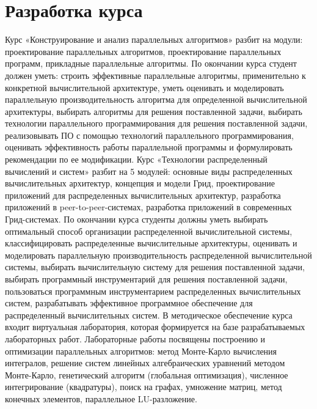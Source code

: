 \documentclass[12pt]{article}
\begin{document}
\section{Разработка курса}
\indent\indent Курс «Конструирование и анализ параллельных алгоритмов» разбит на модули: проектирование параллельных алгоритмов, проектирование параллельных программ, прикладные параллельные алгоритмы. По окончании курса студент должен уметь: строить эффективные параллельные алгоритмы, применительно к конкретной вычислительной архитектуре, уметь оценивать и моделировать параллельную производительность алгоритма для определенной вычислительной архитектуры, выбирать алгоритмы для решения поставленной задачи, выбирать технологии параллельного программирования для решения поставленной задачи, реализовывать ПО с помощью технологий параллельного программирования, оценивать эффективность работы параллельной программы и формулировать рекомендации по ее модификации. \newline
\indent Курс «Технологии распределенный вычислений и систем» разбит на 5 модулей: основные виды распределенных вычислительных архитектур, концепция и модели Грид, проектирование приложений для распределенных вычислительных архитектур, разработка приложений в peer-to-peer-системах, разработка приложений в современных Грид-системах. По окончании курса студенты должны уметь выбирать оптимальный способ организации распределенной вычислительной системы, классифицировать распределенные вычислительные архитектуры, оценивать и моделировать параллельную производительность распределенной вычислительной системы, выбирать вычислительную систему для решения поставленной задачи, выбирать программный инструментарий для решения поставленной задачи, пользоваться программным инструментарием распределенных вычислительных систем, разрабатывать эффективное программное обеспечение для распределенный вычислительных систем.
В методическое обеспечение курса входит виртуальная лаборатория, которая формируется на базе разрабатываемых лабораторных работ. Лабораторные работы посвящены построению и оптимизации параллельных алгоритмов: метод Монте-Карло вычисления интегралов, решение систем линейных алгебраических уравнений методом Монте-Карло, генетический алгоритм (глобальная оптимизация), численное интегрирование (квадратуры), поиск на графах, умножение матриц, метод конечных элементов, параллельное LU-разложение.
\end{document}
